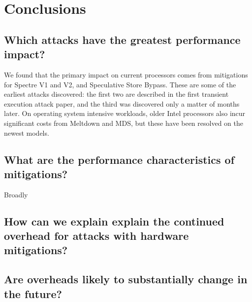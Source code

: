 \section{Conclusions}
\subsection{Which attacks have the greatest performance impact?}

We found that the primary impact on current processors comes from mitigations for Spectre V1 and V2, and Speculative Store Bypass.
These are some of the earliest attacks discovered: the first two are described in the first transient execution attack paper, and the third was discovered only a matter of months later.
On operating system intensive workloads, older Intel processors also incur significant costs from Meltdown and MDS, but these have been resolved on the newest models.

\subsection{What are the performance characteristics of mitigations?}

Broadly 

\subsection{How can we explain explain the continued overhead for attacks with hardware mitigations?}
\subsection{Are overheads likely to substantially change in the future?}
